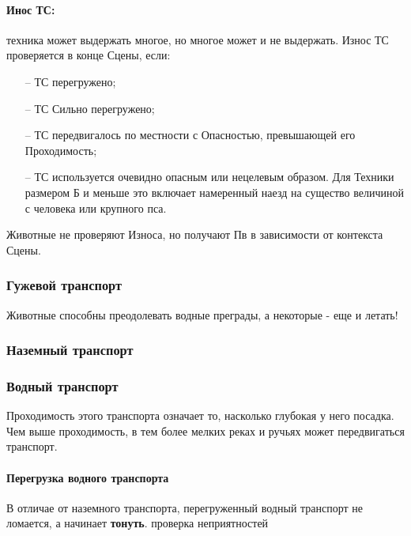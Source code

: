 \paragraph{Инос ТС:} техника может выдержать многое, но многое может и не выдержать. Износ ТС проверяется в конце Сцены, если:
\begin{itemize}
  \item[--] ТС перегружено;
  \item[--] ТС Сильно перегружено;
  \item[--] ТС передвигалось по местности с Опасностью, превышающей его Проходимость;
  \item[--] ТС используется очевидно опасным или нецелевым образом. Для Техники размером Б и меньше это включает намеренный наезд на существо величиной с человека или крупного пса.
\end{itemize}
Животные не проверяют Износа, но получают Пв в зависимости от контекста Сцены.

\subsubsection{Гужевой транспорт}
Животные способны преодолевать водные преграды, а некоторые - еще и летать!

\subsubsection{Наземный транспорт}

\subsubsection{Водный транспорт}
Проходимость этого транспорта означает то, насколько глубокая у него посадка. Чем выше проходимость, в тем более мелких реках и ручьях может передвигаться транспорт.
\paragraph{Перегрузка водного транспорта} В отличае от наземного транспорта, перегруженный водный транспорт не ломается, а начинает \textbf{тонуть}.
\tbd проверка неприятностей
